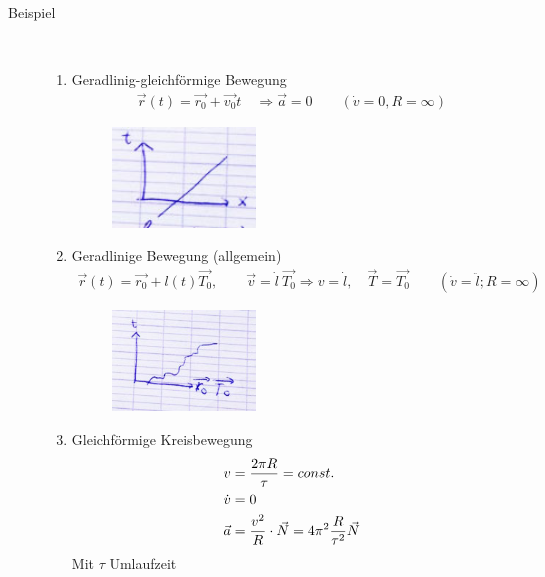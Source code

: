 
\begin{description}
\item[Beispiel]~\par
\begin{enumerate}
\item Geradlinig-gleichförmige Bewegung
\begin{align*}
  \vec{r}(t)=\vec{r_0}+\vec{v_0}t \quad
  \Rightarrow\vec{a}=0 \qquad
  (\dot{v}=0, R=\infty)
\end{align*}
\begin{figure}[h]
\begin{center}
\includegraphics[width=0.4\textwidth]{Skizzen/Anhang8Kopie.jpg}
\end{center}
\caption{}
\end{figure}
\item Geradlinige Bewegung (allgemein)
\begin{align*}
\vec{r}(t)=\vec{r_0}+l(t)\vec{T_0},\qquad
\vec{v}=\dot{l}\: \vec{T_0} \Rightarrow v=\dot{l}, \quad
\vec{T}=\vec{T_0} \qquad
(\dot{v}=\ddot{l}; R=\infty)
\end{align*}
\begin{figure}[h]
\begin{center}
\includegraphics[width=0.4\textwidth]{Skizzen/Anhang8.jpg}
\end{center}
\caption{}
\end{figure}
\item Gleichförmige Kreisbewegung
\begin{align*}
v&=\frac{2\pi R}{\tau} = const.\\
\dot{v}&=0\\
\vec{a}&=\frac{v^2}{R}\cdot \vec{N}=4\pi^2\frac{R}{\tau^2}\vec{N}
\end{align*}
Mit $\tau$ Umlaufzeit\\


\end{enumerate}
\end{description}
